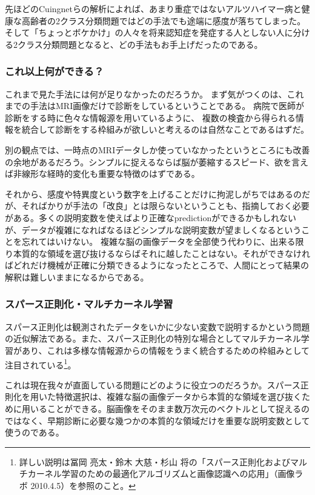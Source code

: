 先ほどのCuingnetらの解析によれば、あまり重症ではないアルツハイマー病と健康な高齢者の2クラス分類問題ではどの手法でも途端に感度が落ちてしまった。そして「ちょっとボケかけ」の人々を将来認知症を発症する人としない人に分ける2クラス分類問題となると、どの手法もお手上げだったのである。

\subsubsection{これ以上何ができる？}
これまで見た手法には何が足りなかったのだろうか。
まず気がつくのは、これまでの手法はMRI画像だけで診断をしているということである。
病院で医師が診断をする時に色々な情報源を用いているように、
複数の検査から得られる情報を統合して診断をする枠組みが欲しいと考えるのは自然なことであるはずだ。

別の観点では、一時点のMRIデータしか使っていなかったというところにも改善の余地があるだろう。シンプルに捉えるならば脳が萎縮するスピード、欲を言えば非線形な経時的変化も重要な特徴のはずである。

それから、感度や特異度という数字を上げることだけに拘泥しがちではあるのだが、そればかりが手法の「改良」とは限らないということも、指摘しておく必要がある。多くの説明変数を使えばより正確なpredictionができるかもしれないが、データが複雑になればなるほどシンプルな説明変数が望ましくなるということを忘れてはいけない。
複雑な脳の画像データを全部使う代わりに、出来る限り本質的な領域を選び抜けるならばそれに越したことはない。それができなければどれだけ機械が正確に分類できるようになったところで、人間にとって結果の解釈は難しいままになるからである。

\subsubsection{スパース正則化・マルチカーネル学習}
スパース正則化は観測されたデータをいかに少ない変数で説明するかという問題の近似解法である。また、スパース正則化の特別な場合としてマルチカーネル学習があり、これは多様な情報源からの情報をうまく統合するための枠組みとして注目されている\footnote{詳しい説明は冨岡 亮太・鈴木 大慈・杉山 将の「スパース正則化およびマルチカーネル学習のための最適化アルゴリズムと画像認識への応用」（画像ラボ 2010.4.5）を参照のこと。}。

これは現在我々が直面している問題にどのように役立つのだろうか。スパース正則化を用いた特徴選択は、複雑な脳の画像データから本質的な領域を選び抜くために用いることができる。脳画像をそのまま数万次元のベクトルとして捉えるのではなく、早期診断に必要な幾つかの本質的な領域だけを重要な説明変数として使うのである。

